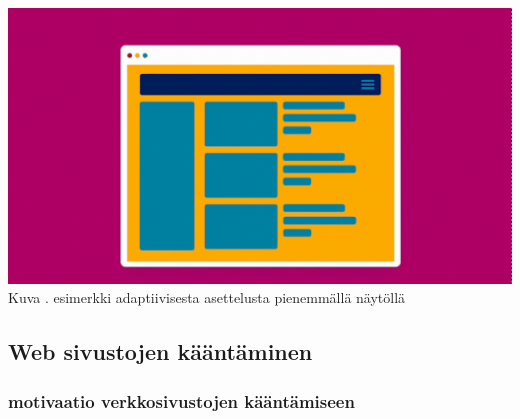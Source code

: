 \documentclass[11pt,a4paper,titlepage,oneside]{article}
\begin{document}
\bigskip

\includegraphics[width = 15cm]{src/public/oppar/adaptivesmall.png}\\
Kuva \getImgCount {}. esimerkki adaptiivisesta asettelusta pienemmällä näytöllä




















\newpage
\subsection{Web sivustojen kääntäminen}






\subsubsection{motivaatio verkkosivustojen kääntämiseen}







\end{document}
